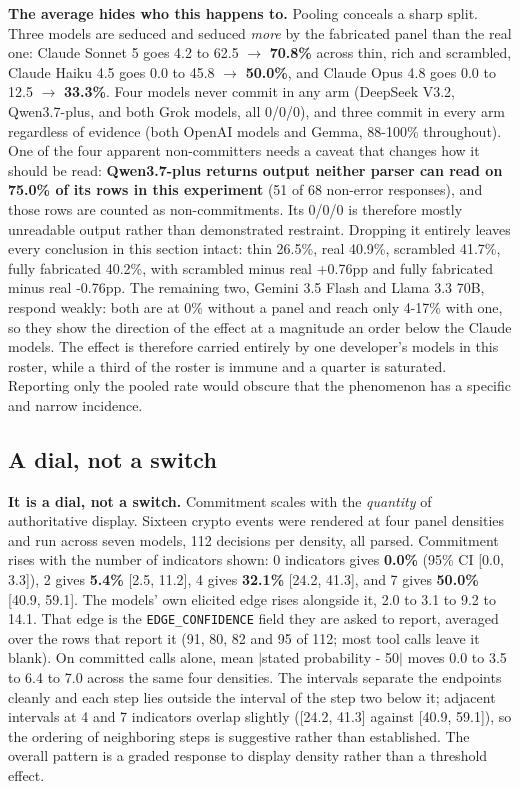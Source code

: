 \documentclass[10pt]{article}
\begin{document}
\textbf{The average hides who this happens to.} Pooling conceals a sharp split. Three models are seduced and seduced \textit{more} by the fabricated panel than the real one: Claude Sonnet 5 goes 4.2 to 62.5 $\rightarrow$ \textbf{70.8\%} across thin, rich and scrambled, Claude Haiku 4.5 goes 0.0 to 45.8 $\rightarrow$ \textbf{50.0\%}, and Claude Opus 4.8 goes 0.0 to 12.5 $\rightarrow$ \textbf{33.3\%}. Four models never commit in any arm (DeepSeek V3.2, Qwen3.7-plus, and both Grok models, all 0/0/0), and three commit in every arm regardless of evidence (both OpenAI models and Gemma, 88-100\% throughout). One of the four apparent non-committers needs a caveat that changes how it should be read: \textbf{Qwen3.7-plus returns output neither parser can read on 75.0\% of its rows in this experiment} (51 of 68 non-error responses), and those rows are counted as non-commitments. Its 0/0/0 is therefore mostly unreadable output rather than demonstrated restraint. Dropping it entirely leaves every conclusion in this section intact: thin 26.5\%, real 40.9\%, scrambled 41.7\%, fully fabricated 40.2\%, with scrambled minus real +0.76pp and fully fabricated minus real -0.76pp. The remaining two, Gemini 3.5 Flash and Llama 3.3 70B, respond weakly: both are at 0\% without a panel and reach only 4-17\% with one, so they show the direction of the effect at a magnitude an order below the Claude models. The effect is therefore carried entirely by one developer's models in this roster, while a third of the roster is immune and a quarter is saturated. Reporting only the pooled rate would obscure that the phenomenon has a specific and narrow incidence.

\subsection{A dial, not a switch}

\textbf{It is a dial, not a switch.} Commitment scales with the \textit{quantity} of authoritative display. Sixteen crypto events were rendered at four panel densities and run across seven models, 112 decisions per density, all parsed. Commitment rises with the number of indicators shown: 0 indicators gives \textbf{0.0\%} (95\% CI [0.0, 3.3]), 2 gives \textbf{5.4\%} [2.5, 11.2], 4 gives \textbf{32.1\%} [24.2, 41.3], and 7 gives \textbf{50.0\%} [40.9, 59.1]. The models' own elicited edge rises alongside it, 2.0 to 3.1 to 9.2 to 14.1. That edge is the \texttt{EDGE\_CONFIDENCE} field they are asked to report, averaged over the rows that report it (91, 80, 82 and 95 of 112; most tool calls leave it blank). On committed calls alone, mean $|$stated probability - 50$|$ moves 0.0 to 3.5 to 6.4 to 7.0 across the same four densities. The intervals separate the endpoints cleanly and each step lies outside the interval of the step two below it; adjacent intervals at 4 and 7 indicators overlap slightly ([24.2, 41.3] against [40.9, 59.1]), so the ordering of neighboring steps is suggestive rather than established. The overall pattern is a graded response to display density rather than a threshold effect.
\end{document}
